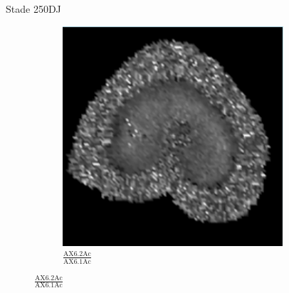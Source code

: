 \documentclass[10pt]{beamer}
\begin{document}
\begin{frame}{Stade 250DJ}
\begin{figure}[ht]
\begin{subfigure}[t]{0.33\textwidth}
      \includegraphics[width=0.9\textwidth]{fig/density_250_slice4}
      \caption{$\frac{\text{AX6.2Ac}}{\text{AX6.1Ac}}$}
      \label{subfig:density_250_slice4}
    \end{subfigure}%

  \end{figure}


\end{frame}
\end{document}
